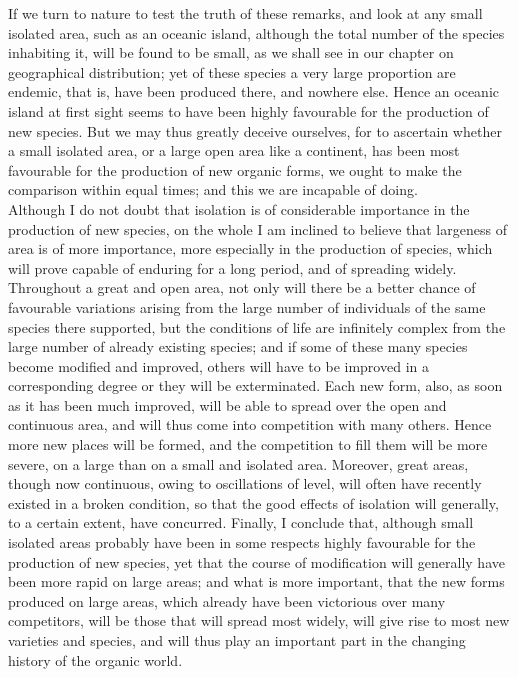 \indent If we turn to nature to test the truth of these remarks, and look at any small isolated area, such as an oceanic island, although the total number of the species inhabiting it, will be found to be small, as we shall see in our chapter on geographical distribution; yet of these species a very large proportion are endemic, that is, have been produced there, and nowhere else. Hence an oceanic island at first sight seems to have been highly favourable for the production of new species. But we may thus greatly deceive ourselves, for to ascertain whether a small isolated area, or a large open area like a continent, has been most favourable for the production of new organic forms, we ought to make the comparison within equal times; and this we are incapable of doing. \\
\indent Although I do not doubt that isolation is of considerable importance in the production of new species, on the whole I am inclined to believe that largeness of area is of more importance, more especially in the production of species, which will prove capable of enduring for a long period, and of spreading widely. Throughout a great and open area, not only will there be a better chance of favourable variations arising from the large number of individuals of the same species there supported, but the conditions of life are infinitely complex from the large number of already existing species; and if some of these many species become modified and improved, others will have to be improved in a corresponding degree or they will be exterminated. Each new form, also, as soon as it has been much improved, will be able to spread over the open and continuous area, and will thus come into competition with many others. Hence more new places will be formed, and the competition to fill them will be more severe, on a large than on a small and isolated area.  Moreover, great areas, though now continuous, owing to oscillations of level, will often have recently existed in a broken condition, so that the good effects of isolation will generally, to a certain extent, have concurred. Finally, I conclude that, although small isolated areas probably have been in some respects highly favourable for the production of new species, yet that the course of modification will generally have been more rapid on large areas; and what is more important, that the new forms produced on large areas, which already have been victorious over many competitors, will be those that will spread most widely, will give rise to most new varieties and species, and will thus play an important part in the changing history of the organic world. \\
